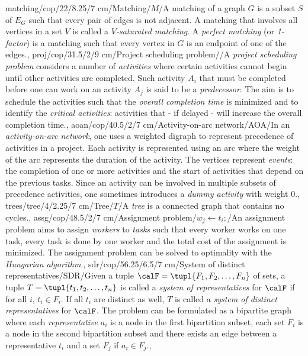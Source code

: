 matching/cop/22/8.25/7 cm/{Matching}/{$M$}/{A matching of a graph $G$ is a subset $S$ of $E_G$ such that every pair of edges is not adjacent. A matching that involves all vertices in a set $V$ is called a \emph{$V$-saturated matching}. A \emph{perfect matching} (or \emph{1-factor}) is a matching such that every vertex in $G$ is an endpoint of one of the edges.},
proj/cop/31.5/2/9 cm/{Project scheduling problem}/{\clock}/{A \emph{project scheduling problem} considers a number of \emph{activities} where certain activities cannot begin until other activities are completed. Such activity $A_i$ that must be completed before one can work on an activity $A_j$ is said to be a \emph{predecessor}. The aim is to schedule the activities such that the \emph{overall completion time} is minimized and to identify the \emph{critical activities}: activities that - if delayed - will increase the overall completion time.},
aoan/cop/40.5/2/7 cm/{Activity-on-arc network}/{AOA}/{In an \emph{activity-on-arc network}, one uses a weighted digraph to represent precedence of activities in a project. Each activity is represented using an arc where the weight of the arc represents the duration of the activity. The vertices represent \emph{events}: the completion of one or more activities and the start of activities that depend on the previous tasks. Since an activity can be involved in multiple subsets of precedence activities, one sometimes introduces a \emph{dummy activity} with weight $0$.},
trees/tree/4/2.25/7 cm/Tree/$T$/{A \emph{tree} is a connected graph that contains no cycles.},%
assg/cop/48.5/2/7 cm/{Assignment problem}/{$w_j\leftarrow t_i;$}/{An assignment problem aims to assign \emph{workers} to \emph{tasks} such that every worker works on one task, every task is done by one worker and the total cost of the assignment is minimized. The assignment problem can be solved to optimality with the \emph{Hungarian algorithm}.},
sdr/cop/56.25/6.5/7 cm/{System of distinct representatives}/{SDR}/{Given a tuple $\calF=\tupl{F_1,F_2,\ldots,F_n}$ of sets, a tuple $T=\tupl{t_1,t_2,\ldots,t_n}$ is called a \emph{system of representatives} for $\calF$ if for all $i$, $t_i\in F_i$. If all $t_i$ are distinct as well, $T$ is called a \emph{system of distinct representatives} for $\calF$. The problem can be formulated as a bipartite graph where each \emph{representative} $a_i$ is a node in the first bipartition subset, each set $F_i$ is a node in the second bipartition subset and there exists an edge between a representative $t_i$ and a set $F_j$ if $a_i\in F_j$.},
